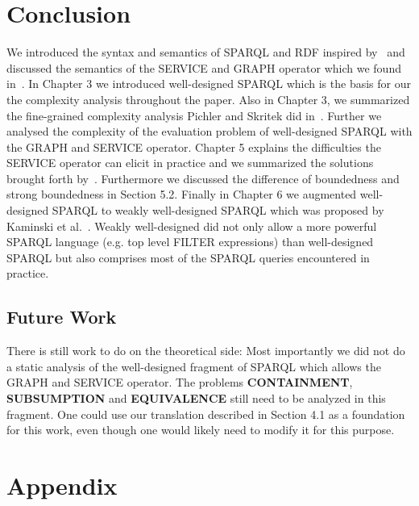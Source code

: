 \documentclass[draft,final]{vutinfth} %
\begin{document}
\chapter{Conclusion}
We introduced the syntax and semantics of SPARQL and RDF inspired
by~\cite{pichler2014containment,perez2009semantics,BuilAranda20131} and discussed
the semantics of the SERVICE and GRAPH operator which we found
in~\cite{BuilAranda20131}. In Chapter 3 we introduced well-designed SPARQL which
is the basis for our the complexity analysis throughout the paper. Also in Chapter 3, we summarized the fine-grained complexity analysis
Pichler and Skritek did in~\cite{pichler2014containment}. Further we analysed the
complexity of the evaluation problem of well-designed  SPARQL with the GRAPH and
SERVICE operator. Chapter 5 explains the difficulties the SERVICE operator can elicit in
practice and we summarized the solutions brought forth
by~\cite{BuilAranda20131}. Furthermore we discussed the difference of boundedness and
strong boundedness in Section 5.2. Finally in Chapter 6 we augmented well-designed
SPARQL to weakly well-designed SPARQL which was proposed by Kaminski et
al.~\cite{kaminski_bwd}. Weakly well-designed did not only allow a more powerful
SPARQL language (e.g. top level FILTER expressions) than well-designed SPARQL but also comprises most of the SPARQL
queries encountered in practice.

\section{Future Work}
There is still work to do on the theoretical side:
Most importantly we did not do a static analysis of the well-designed fragment of SPARQL
which allows the GRAPH and SERVICE operator. The problems \textbf{CONTAINMENT},
\textbf{SUBSUMPTION} and \textbf{EQUIVALENCE} still need to be analyzed in this
fragment. One could use our translation described in Section 4.1 as a foundation
for this work, even though one would likely need to modify it for this purpose.
\backmatter

\listoffigures %

\listoftables %

\listofalgorithms
{}


\printindex

\printglossaries




\chapter{Appendix}

\end{document}
